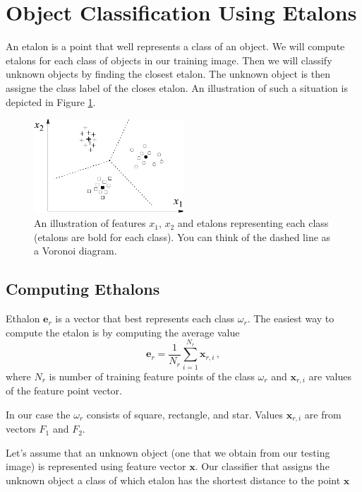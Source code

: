 \documentclass[12pt]{article}
\begin{document}
\section*{Object Classification Using Etalons}

An etalon is a point that well represents a class of an object. We will compute etalons for each class of objects in our training image.
Then we will classify unknown objects by finding the closest etalon. The unknown object is then assigne the class label of the closes etalon.
An illustration of such a situation is depicted in Figure \ref{fig:etalons_diagram}.

\begin{figure}[h]
\begin{centering}
\includegraphics[width=0.5\textwidth]{etalons_diagram.png}
\caption{An illustration of features $x_1$, $x_2$ and etalons representing each class (etalons are bold for each class). You can think of the dashed line as a Voronoi diagram.}
\label{fig:etalons_diagram}
\end{centering}
\end{figure}


\subsection*{Computing Ethalons}

Ethalon $\mathbf{e}_r$ is a vector that best represents each class $\omega_r$.
The easiest way to compute the etalon is by computing the average value
\begin{equation}
    \mathbf{e}_r = \frac{1}{N_r}\sum\limits_{i=1}^{N_r} \mathbf{x}_{r, i} \, ,
    \label{eq:average}
\end{equation}
where $N_r$ is number of training feature points of the class $\omega_r$ and $\mathbf{x}_{r, i}$ are values of the feature point vector.

In our case the  $\omega_r$ consists of square, rectangle, and star. Values $\mathbf{x}_{r, i}$ are from vectors $F_1$ and $F_2$.

Let's assume that an unknown object (one that we obtain from our testing image) is represented using feature vector $\mathbf{x}$.
Our classifier that assigns the unknown object a class of which etalon has the shortest distance to the point $\mathbf{x}$
\end{document}
